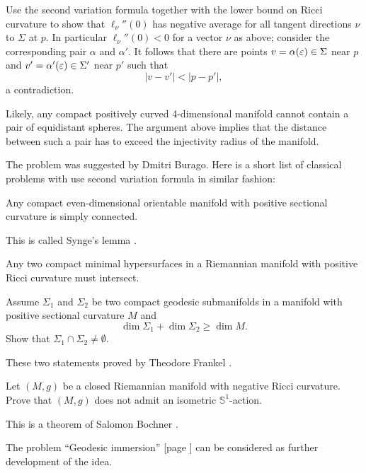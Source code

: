Use the second variation formula together with the lower bound on Ricci curvature
to show that $\ell_\nu''(0)$ has negative average for all tangent directions $\nu$ to $\Sigma$ at $p$. 
In particular $\ell_\nu''(0)<0$ for a vector $\nu$ as above;
consider the corresponding pair $\alpha$ and $\alpha'$.
It follows that there are points $v=\alpha(\varepsilon)\in\Sigma$ near $p$ 
and $v'=\alpha'(\varepsilon)\in\Sigma'$ near $p'$
such that 
\[|v-v'|<|p-p'|,\]
a contradiction.\qeds

Likely, any compact positively curved 
4-dimensional manifold
cannot contain a pair of equidistant spheres.
The argument above implies that the distance between such a pair has to exceed the injectivity radius of the manifold.


The problem was suggested by Dmitri Burago.
Here is a short list of classical problems with use second variation formula in similar 	fashion:

\begin{pr}
Any compact even-dimensional orientable manifold with positive sectional curvature is
simply connected.
\end{pr}

This is called Synge's lemma \cite[see][]{synge}.

\begin{pr}
Any two compact minimal hypersurfaces in a Riemannian manifold with positive Ricci curvature must intersect.
\end{pr}

\begin{pr}
Assume $\Sigma_1$ and $\Sigma_2$ be two compact geodesic submanifolds in a manifold with positive sectional curvature $M$ and 
\[\dim \Sigma_1+\dim \Sigma_2\ge \dim M.\] 
Show that $\Sigma_1\cap\Sigma_2\ne\emptyset$.
\end{pr}

These two statements proved by Theodore Frankel \cite[see][]{frankel}.\label{page:frankel}

\begin{pr}
Let $(M,g)$ be a closed Riemannian manifold with negative Ricci curvature.
Prove that $(M,g)$ does not admit an isometric $\mathbb{S}^1$-action.
\end{pr}

This is a theorem of Salomon Bochner \cite[see][]{bochner}.

The problem ``Geodesic immersion'' [page \pageref{Geodesic immersion}] can be considered as further development of the idea.






